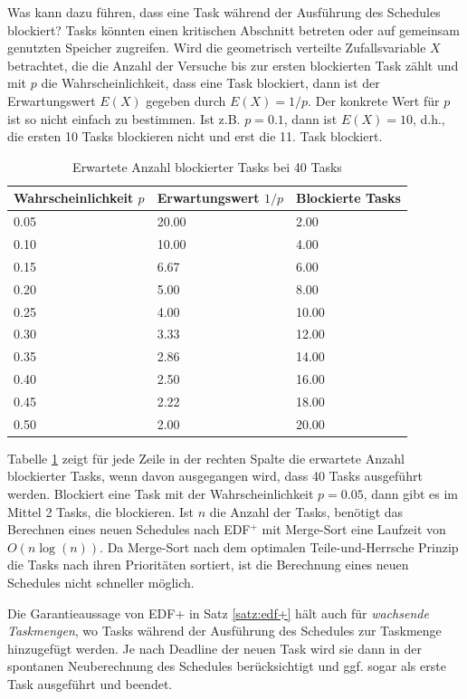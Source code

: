 \documentclass{scrarticle}
\numberwithin{equation}{section}
\begin{document}
Was kann dazu führen, dass eine Task während der Ausführung des Schedules blockiert? Tasks könnten einen kritischen Abschnitt betreten oder auf gemeinsam genutzten Speicher zugreifen. Wird die geometrisch verteilte Zufallsvariable $X$ betrachtet, die die Anzahl der Versuche bis zur ersten blockierten Task zählt und mit $p$ die Wahrscheinlichkeit, dass eine Task blockiert, dann ist der Erwartungswert $E(X)$ gegeben durch $E(X)= 1 / p$. Der konkrete Wert für $p$ ist so nicht einfach zu bestimmen. Ist z.B. $p = 0.1$, dann ist $E(X) = 10$, d.h., die ersten 10 Tasks blockieren nicht und erst die 11. Task blockiert.
\begin{table}[h]
	\centering
	\begin{tabular}{m{3.5cm}|m{3.5cm}|m{3.5cm}}
		\hline
		Wahrscheinlichkeit $p$ & Erwartungswert $1/p$ & Blockierte Tasks\\
		\hline\hline
		0.05 & 20.00 & 2.00 \\
		0.10 & 10.00 & 4.00 \\
		0.15 & 6.67 & 6.00 \\
		0.20 & 5.00 & 8.00 \\
		0.25 & 4.00 & 10.00 \\
		0.30 & 3.33 & 12.00 \\
		0.35 & 2.86 & 14.00 \\
		0.40 & 2.50 & 16.00 \\
		0.45 & 2.22 & 18.00 \\
		0.50 & 2.00 & 20.00 \\
		\hline
	\end{tabular}
	\caption{Erwartete Anzahl blockierter Tasks bei 40 Tasks}
	\label{tab:geometric-expectation}
\end{table}
Tabelle \ref{tab:geometric-expectation} zeigt für jede Zeile in der rechten Spalte die erwartete Anzahl blockierter Tasks, wenn davon ausgegangen wird, dass 40 Tasks ausgeführt werden. Blockiert eine Task mit der Wahrscheinlichkeit $p = 0.05$, dann gibt es im Mittel 2 Tasks, die blockieren. Ist $n$ die Anzahl der Tasks, benötigt das Berechnen eines neuen Schedules nach EDF$^+$ mit Merge-Sort eine Laufzeit von $O(n \log(n))$. Da Merge-Sort nach dem optimalen Teile-und-Herrsche Prinzip die Tasks nach ihren Prioritäten sortiert, ist die Berechnung eines neuen Schedules nicht schneller möglich. 

Die Garantieaussage von EDF$+$ in Satz \ref{satz:edf+} hält auch für \textit{wachsende Taskmengen}, wo Tasks während der Ausführung des Schedules zur Taskmenge hinzugefügt werden. Je nach Deadline der neuen Task wird sie dann in der spontanen Neuberechnung des Schedules berücksichtigt und ggf. sogar als erste Task ausgeführt und beendet.
\end{document}
